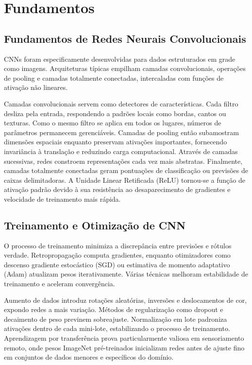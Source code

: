 \documentclass[12pt,a4paper]{article}
\begin{document}
\section{Fundamentos}
\label{sec:background}
\subsection{Fundamentos de Redes Neurais Convolucionais}
CNNs foram especificamente desenvolvidas para dados estruturados em grade como imagens. Arquiteturas típicas empilham camadas convolucionais, operações de pooling e camadas totalmente conectadas, intercaladas com funções de ativação não lineares.

Camadas convolucionais servem como detectores de características. Cada filtro desliza pela entrada, respondendo a padrões locais como bordas, cantos ou texturas. Como o mesmo filtro se aplica em todos os lugares, números de parâmetros permanecem gerenciáveis. Camadas de pooling então subamostram dimensões espaciais enquanto preservam ativações importantes, fornecendo invariância à translação e reduzindo carga computacional. Através de camadas sucessivas, redes constroem representações cada vez mais abstratas. Finalmente, camadas totalmente conectadas geram pontuações de classificação ou previsões de caixas delimitadoras. A Unidade Linear Retificada (ReLU) tornou-se a função de ativação padrão devido à sua resistência ao desaparecimento de gradientes e velocidade de treinamento mais rápida.

\subsection{Treinamento e Otimização de CNN}
O processo de treinamento minimiza a discrepância entre previsões e rótulos verdade. Retropropagação computa gradientes, enquanto otimizadores como descenso gradiente estocástico (SGD) ou estimativa de momento adaptativo (Adam) atualizam pesos iterativamente. Várias técnicas melhoram estabilidade de treinamento e aceleram convergência.

Aumento de dados introduz rotações aleatórias, inversões e deslocamentos de cor, expondo redes a mais variação. Métodos de regularização como dropout e decaimento de peso previnem sobreajuste. Normalização em lote padroniza ativações dentro de cada mini-lote, estabilizando o processo de treinamento. Aprendizagem por transferência prova particularmente valiosa em sensoriamento remoto, onde pesos ImageNet pré-treinados inicializam redes antes de ajuste fino em conjuntos de dados menores e específicos do domínio.
\end{document}
